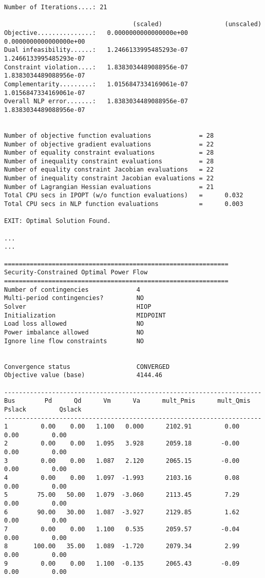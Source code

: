 \begin{lstlisting}
Number of Iterations....: 21

                                   (scaled)                 (unscaled)
Objective...............:   0.0000000000000000e+00    0.0000000000000000e+00
Dual infeasibility......:   1.2466133995485293e-07    1.2466133995485293e-07
Constraint violation....:   1.8383034489088956e-07    1.8383034489088956e-07
Complementarity.........:   1.0156847334169061e-07    1.0156847334169061e-07
Overall NLP error.......:   1.8383034489088956e-07    1.8383034489088956e-07


Number of objective function evaluations             = 28
Number of objective gradient evaluations             = 22
Number of equality constraint evaluations            = 28
Number of inequality constraint evaluations          = 28
Number of equality constraint Jacobian evaluations   = 22
Number of inequality constraint Jacobian evaluations = 22
Number of Lagrangian Hessian evaluations             = 21
Total CPU secs in IPOPT (w/o function evaluations)   =      0.032
Total CPU secs in NLP function evaluations           =      0.003

EXIT: Optimal Solution Found.

...
...

=============================================================
Security-Constrained Optimal Power Flow
=============================================================
Number of contingencies             4
Multi-period contingencies?         NO
Solver                              HIOP
Initialization                      MIDPOINT
Load loss allowed                   NO
Power imbalance allowed             NO
Ignore line flow constraints        NO


Convergence status                  CONVERGED
Objective value (base)              4144.46

----------------------------------------------------------------------
Bus        Pd      Qd      Vm      Va      mult_Pmis      mult_Qmis      Pslack         Qslack        
----------------------------------------------------------------------
1         0.00    0.00   1.100   0.000      2102.91         0.00         0.00         0.00
2         0.00    0.00   1.095   3.928      2059.18        -0.00         0.00         0.00
3         0.00    0.00   1.087   2.120      2065.15        -0.00         0.00         0.00
4         0.00    0.00   1.097  -1.993      2103.16         0.08         0.00         0.00
5        75.00   50.00   1.079  -3.060      2113.45         7.29         0.00         0.00
6        90.00   30.00   1.087  -3.927      2129.85         1.62         0.00         0.00
7         0.00    0.00   1.100   0.535      2059.57        -0.04         0.00         0.00
8       100.00   35.00   1.089  -1.720      2079.34         2.99         0.00         0.00
9         0.00    0.00   1.100  -0.135      2065.43        -0.09         0.00         0.00


\end{lstlisting}
